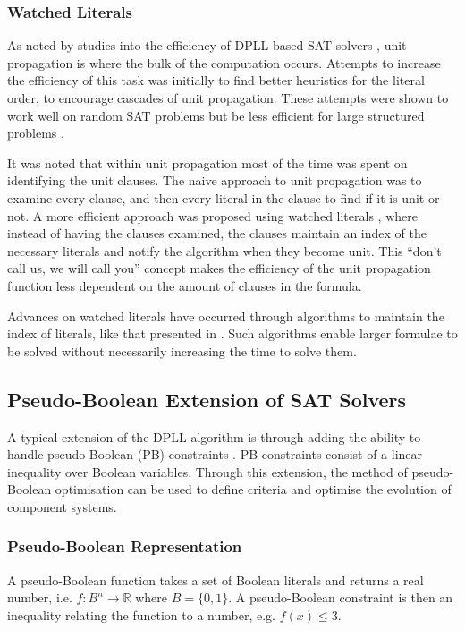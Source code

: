 \subsubsection{Watched Literals}
As noted by studies into the efficiency of DPLL-based SAT solvers \citep{dixon2004automating}, unit propagation is where the bulk of the computation occurs.
Attempts to increase the efficiency of this task was initially to find better heuristics \citep{JamesMCrawford1996} for the literal order, to encourage cascades of unit propagation.
These attempts were shown to work well on random SAT problems but be less efficient for large structured problems \citep{dixon2004automating}.

It was noted that within unit propagation most of the time was spent on identifying the unit clauses.
The naive approach to unit propagation was to examine every clause, and then every literal in the clause to find if it is unit or not.
A more efficient approach was proposed using watched literals \citep{Madigan2001}, where instead of having the clauses examined, 
the clauses maintain an index of the necessary literals and notify the algorithm when they become unit.
This ``don't call us, we will call you'' concept makes the efficiency of the unit propagation function less dependent on the amount of clauses in the formula.

Advances on watched literals have occurred through algorithms to maintain the index of literals, like that presented in \citep{Moskewicz2001}.
Such algorithms enable larger formulae to be solved without necessarily increasing the time to solve them.

\subsection{Pseudo-Boolean Extension of SAT Solvers}
A typical extension of the DPLL algorithm is through adding the ability to handle pseudo-Boolean (PB) constraints \citep{dixon2004automating}.
PB constraints consist of a linear inequality over Boolean variables.
Through this extension, the method of pseudo-Boolean optimisation can be used to define criteria and optimise the evolution of component systems.

\subsubsection{Pseudo-Boolean Representation}
A pseudo-Boolean function takes a set of Boolean literals and returns a real number, i.e. $f:B^n \rightarrow \mathbb{R}$ where $B = \{0,1\}$.
A pseudo-Boolean constraint is then an inequality relating the function to a number, e.g. $f(x) \leq 3$.

